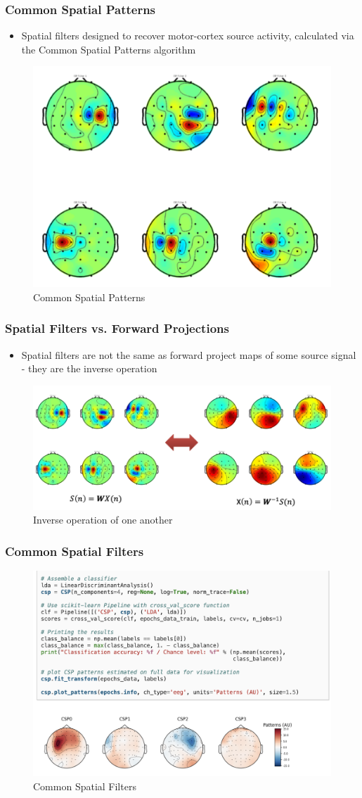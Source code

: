\documentclass{beamer}
\begin{document}
\begin{frame}
\frametitle{Common Spatial Patterns}
\begin{itemize}
	\item Spatial filters designed to recover motor-cortex source activity, calculated via the Common Spatial Patterns algorithm
\end{itemize}
\begin{figure}
	\includegraphics[width=0.6\linewidth]{image/sfilter}
	\caption{Common Spatial Patterns}
\end{figure}
\end{frame}

\begin{frame}
\frametitle{Spatial Filters vs. Forward Projections}
\begin{itemize}
	\item Spatial filters are not the same as forward project maps of some source signal - they are the inverse operation
\end{itemize}
\begin{figure}
	\includegraphics[width=0.8\linewidth]{image/sfilter2}
	\caption{Inverse operation of one another}
\end{figure}
\end{frame}

\begin{frame}
\frametitle{Common Spatial Filters}
\begin{figure}
	\includegraphics[width=0.7\linewidth]{image/csp}
	\caption{Common Spatial Filters}
\end{figure}
\end{frame}
\end{document}
